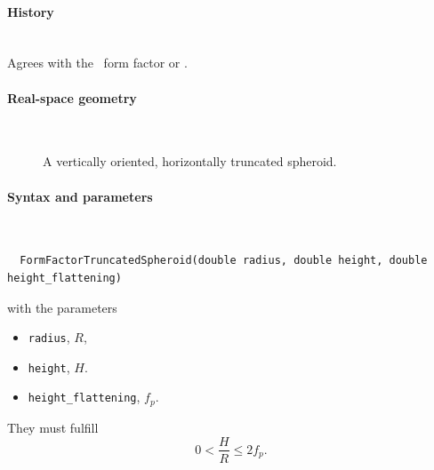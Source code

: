 \paragraph{History}\strut\\
Agrees with the \IsGISAXS\ form factor
 \cite[Eq.~2.33]{Laz08} or
 \cite[Eq.~228]{ReLL09}.


 \label{STruncatedSpheroid}

\paragraph{Real-space geometry}\strut\\

\begin{figure}[H]
\hfill
{}
\hfill
{}
\hfill
{}
\hfill
\caption{A vertically oriented, horizontally truncated spheroid.}
\end{figure}

\paragraph{Syntax and parameters}\strut\\[-2ex plus .2ex minus .2ex]
\begin{lstlisting}
  FormFactorTruncatedSpheroid(double radius, double height, double height_flattening)
\end{lstlisting}
with the parameters
\begin{itemize}
\item \texttt{radius}, $R$,
\item \texttt{height}, $H$.
\item \texttt{height\_flattening}, $f_p$.
\end{itemize}
They must fulfill
\begin{displaymath}
  0< \dfrac{H}{R}\le 2f_p.
\end{displaymath}

